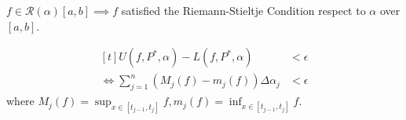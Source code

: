 \documentclass[
	UTF-8,
	11pt, %
	a4paper, %
]{LegrandOrangeBook}
\begin{document}
    \begin{lemma}
        $f \in \mathcal{R}(\alpha)[a,b] \implies f$ satisfied the
        Riemann-Stieltje Condition respect to $\alpha$ over $[a,b]$.
    \end{lemma}

    \begin{analysis}
        $$
        \begin{aligned}[t]
            U(f,P^{*},\alpha) - L(f,P^{*},\alpha) &< \epsilon \\
            \iff \sum_{j=1}^{n}\left( M_j(f) - m_j(f) \right)\Delta \alpha_j &< \epsilon 
        \end{aligned}
        $$
        where $M_j(f) = \sup_{x \in [t_{j-1}, t_j]} f , m_j(f) = \inf_{x \in [t_{j-1}, t_j]} f$.
    \end{analysis}
\end{document}
